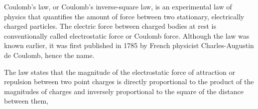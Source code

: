 

Coulomb's law, or Coulomb's inverse-square law, is an experimental law of physics that quantifies the amount of force between two stationary, electrically charged particles. The electric force between charged bodies at rest is conventionally called electrostatic force or Coulomb force. Although the law was known earlier, it was first published in 1785 by French physicist Charles-Augustin de Coulomb, hence the name. 

The law states that the magnitude of the electrostatic force of attraction or repulsion between two point charges is directly proportional to the product of the magnitudes of charges and inversely proportional to the square of the distance between them, 

